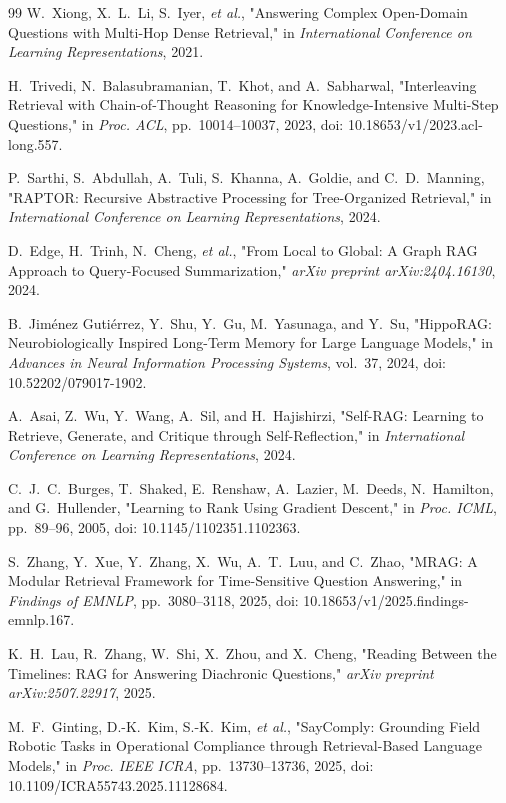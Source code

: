 \begin{thebibliography}{99}
W.~Xiong, X.~L.~Li, S.~Iyer, \emph{et al.},
"Answering Complex Open-Domain Questions with Multi-Hop Dense Retrieval,"
in \emph{International Conference on Learning Representations}, 2021.

H.~Trivedi, N.~Balasubramanian, T.~Khot, and A.~Sabharwal,
"Interleaving Retrieval with Chain-of-Thought Reasoning for Knowledge-Intensive Multi-Step Questions,"
in \emph{Proc. ACL}, pp.~10014--10037, 2023,
doi: 10.18653/v1/2023.acl-long.557.

P.~Sarthi, S.~Abdullah, A.~Tuli, S.~Khanna, A.~Goldie, and C.~D.~Manning,
"RAPTOR: Recursive Abstractive Processing for Tree-Organized Retrieval,"
in \emph{International Conference on Learning Representations}, 2024.

D.~Edge, H.~Trinh, N.~Cheng, \emph{et al.},
"From Local to Global: A Graph RAG Approach to Query-Focused Summarization,"
\emph{arXiv preprint arXiv:2404.16130}, 2024.

B.~Jim\'enez Guti\'errez, Y.~Shu, Y.~Gu, M.~Yasunaga, and Y.~Su,
"HippoRAG: Neurobiologically Inspired Long-Term Memory for Large Language Models,"
in \emph{Advances in Neural Information Processing Systems}, vol.~37, 2024,
doi: 10.52202/079017-1902.

A.~Asai, Z.~Wu, Y.~Wang, A.~Sil, and H.~Hajishirzi,
"Self-RAG: Learning to Retrieve, Generate, and Critique through Self-Reflection,"
in \emph{International Conference on Learning Representations}, 2024.

C.~J.~C.~Burges, T.~Shaked, E.~Renshaw, A.~Lazier, M.~Deeds, N.~Hamilton, and G.~Hullender,
"Learning to Rank Using Gradient Descent,"
in \emph{Proc. ICML}, pp.~89--96, 2005,
doi: 10.1145/1102351.1102363.

S.~Zhang, Y.~Xue, Y.~Zhang, X.~Wu, A.~T.~Luu, and C.~Zhao,
"MRAG: A Modular Retrieval Framework for Time-Sensitive Question Answering,"
in \emph{Findings of EMNLP}, pp.~3080--3118, 2025,
doi: 10.18653/v1/2025.findings-emnlp.167.

K.~H.~Lau, R.~Zhang, W.~Shi, X.~Zhou, and X.~Cheng,
"Reading Between the Timelines: RAG for Answering Diachronic Questions,"
\emph{arXiv preprint arXiv:2507.22917}, 2025.

M.~F.~Ginting, D.-K.~Kim, S.-K.~Kim, \emph{et al.},
"SayComply: Grounding Field Robotic Tasks in Operational Compliance through Retrieval-Based Language Models,"
in \emph{Proc. IEEE ICRA}, pp.~13730--13736, 2025,
doi: 10.1109/ICRA55743.2025.11128684.


\end{thebibliography}
